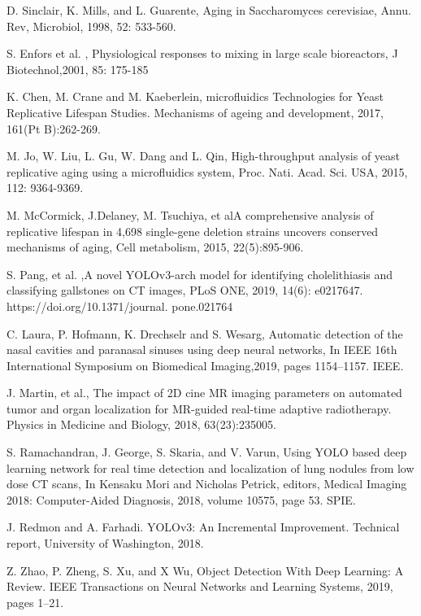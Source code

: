 \documentclass[conference]{IEEEtran}
\begin{document}
\begin{thebibliography}{00}

D. Sinclair, K. Mills, and L. Guarente,  Aging in Saccharomyces cerevisiae, Annu. Rev,  Microbiol, 1998, 52: 533-560.



S. Enfors  et al. , Physiological responses to mixing in large scale bioreactors, J Biotechnol,2001, 85: 175-185



K. Chen, M. Crane and  M. Kaeberlein, microfluidics Technologies for Yeast Replicative Lifespan Studies. Mechanisms of ageing and development, 2017, 161(Pt B):262-269.



 M. Jo, W. Liu, L. Gu, W. Dang and  L. Qin, High-throughput analysis of yeast replicative aging using a microfluidics system, Proc. Nati. Acad. Sci. USA, 2015, 112: 9364-9369.



M. McCormick,  J.Delaney, M. Tsuchiya, et alA comprehensive analysis of replicative lifespan in 4,698 single-gene deletion strains uncovers conserved mechanisms of aging, Cell metabolism, 2015, 22(5):895-906.


S. Pang,  et al. ,A novel YOLOv3-arch model for identifying cholelithiasis and classifying gallstones on CT images, PLoS ONE, 2019, 14(6): e0217647. https://doi.org/10.1371/journal. pone.021764

C.  Laura, P. Hofmann, K. Drechselr  and S. Wesarg, Automatic detection of the nasal cavities and paranasal sinuses using deep neural networks, In IEEE 16th International Symposium on Biomedical Imaging,2019, pages 1154–1157. IEEE.

J. Martin, et al., The impact of 2D cine MR imaging parameters on automated tumor and organ localization for MR-guided real-time adaptive radiotherapy. Physics in Medicine and Biology, 2018, 63(23):235005.

S. Ramachandran, J. George, S. Skaria, and  V. Varun,  Using YOLO based deep learning network for real time detection and localization of lung nodules from low dose CT scans, In Kensaku Mori and Nicholas Petrick, editors, Medical Imaging 2018: Computer-Aided Diagnosis, 2018, volume 10575, page 53. SPIE.

J. Redmon and A. Farhadi. YOLOv3: An Incremental Improvement. Technical report, University of Washington, 2018.

Z. Zhao, P. Zheng, S. Xu, and X Wu, Object Detection With Deep Learning: A Review. IEEE Transactions on Neural Networks and Learning Systems, 2019, pages 1–21.


\end{thebibliography}
\end{document}
